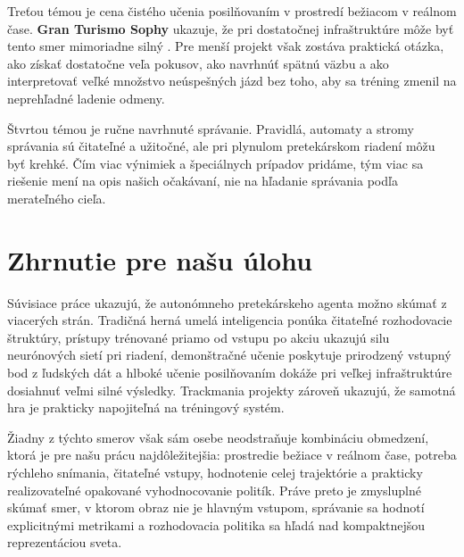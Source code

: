 Treťou témou je cena čistého učenia posilňovaním v prostredí bežiacom v reálnom čase. \textbf{Gran Turismo Sophy} ukazuje, že pri dostatočnej infraštruktúre môže byť tento smer mimoriadne silný \cite{wurman2022gt_sophy}. Pre menší projekt však zostáva praktická otázka, ako získať dostatočne veľa pokusov, ako navrhnúť spätnú väzbu a ako interpretovať veľké množstvo neúspešných jázd bez toho, aby sa tréning zmenil na neprehľadné ladenie odmeny.

Štvrtou témou je ručne navrhnuté správanie. Pravidlá, automaty a stromy správania sú čitateľné a užitočné, ale pri plynulom pretekárskom riadení môžu byť krehké. Čím viac výnimiek a špeciálnych prípadov pridáme, tým viac sa riešenie mení na opis našich očakávaní, nie na hľadanie správania podľa merateľného cieľa.

\section{Zhrnutie pre našu úlohu}

Súvisiace práce ukazujú, že autonómneho pretekárskeho agenta možno skúmať z viacerých strán. Tradičná herná umelá inteligencia ponúka čitateľné rozhodovacie štruktúry, prístupy trénované priamo od vstupu po akciu ukazujú silu neurónových sietí pri riadení, demonštračné učenie poskytuje prirodzený vstupný bod z ľudských dát a hlboké učenie posilňovaním dokáže pri veľkej infraštruktúre dosiahnuť veľmi silné výsledky. Trackmania projekty zároveň ukazujú, že samotná hra je prakticky napojiteľná na tréningový systém.

Žiadny z týchto smerov však sám osebe neodstraňuje kombináciu obmedzení, ktorá je pre našu prácu najdôležitejšia: prostredie bežiace v reálnom čase, potreba rýchleho snímania, čitateľné vstupy, hodnotenie celej trajektórie a prakticky realizovateľné opakované vyhodnocovanie politík. Práve preto je zmysluplné skúmať smer, v ktorom obraz nie je hlavným vstupom, správanie sa hodnotí explicitnými metrikami a rozhodovacia politika sa hľadá nad kompaktnejšou reprezentáciou sveta.
